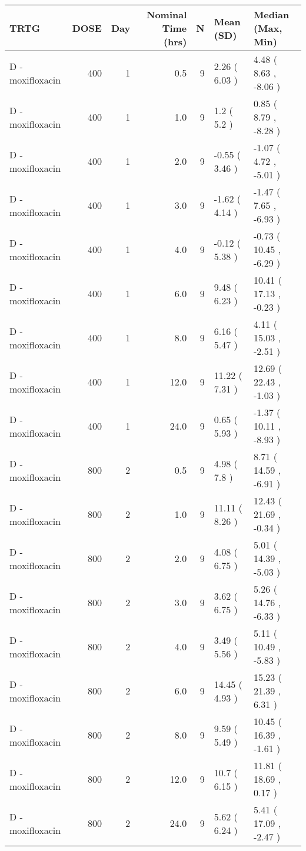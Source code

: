 
\begin{tabular}{lrrrrll}
\toprule
TRTG & DOSE & Day & Nominal Time (hrs) & N & Mean (SD) & Median (Max, Min)\\
\midrule
D - moxifloxacin & 400 & 1 & 0.5 & 9 & 2.26 ( 6.03 ) & 4.48 ( 8.63 , -8.06 )\\
D - moxifloxacin & 400 & 1 & 1.0 & 9 & 1.2 ( 5.2 ) & 0.85 ( 8.79 , -8.28 )\\
D - moxifloxacin & 400 & 1 & 2.0 & 9 & -0.55 ( 3.46 ) & -1.07 ( 4.72 , -5.01 )\\
D - moxifloxacin & 400 & 1 & 3.0 & 9 & -1.62 ( 4.14 ) & -1.47 ( 7.65 , -6.93 )\\
D - moxifloxacin & 400 & 1 & 4.0 & 9 & -0.12 ( 5.38 ) & -0.73 ( 10.45 , -6.29 )\\
D - moxifloxacin & 400 & 1 & 6.0 & 9 & 9.48 ( 6.23 ) & 10.41 ( 17.13 , -0.23 )\\
D - moxifloxacin & 400 & 1 & 8.0 & 9 & 6.16 ( 5.47 ) & 4.11 ( 15.03 , -2.51 )\\
D - moxifloxacin & 400 & 1 & 12.0 & 9 & 11.22 ( 7.31 ) & 12.69 ( 22.43 , -1.03 )\\
D - moxifloxacin & 400 & 1 & 24.0 & 9 & 0.65 ( 5.93 ) & -1.37 ( 10.11 , -8.93 )\\
D - moxifloxacin & 800 & 2 & 0.5 & 9 & 4.98 ( 7.8 ) & 8.71 ( 14.59 , -6.91 )\\
D - moxifloxacin & 800 & 2 & 1.0 & 9 & 11.11 ( 8.26 ) & 12.43 ( 21.69 , -0.34 )\\
D - moxifloxacin & 800 & 2 & 2.0 & 9 & 4.08 ( 6.75 ) & 5.01 ( 14.39 , -5.03 )\\
D - moxifloxacin & 800 & 2 & 3.0 & 9 & 3.62 ( 6.75 ) & 5.26 ( 14.76 , -6.33 )\\
D - moxifloxacin & 800 & 2 & 4.0 & 9 & 3.49 ( 5.56 ) & 5.11 ( 10.49 , -5.83 )\\
D - moxifloxacin & 800 & 2 & 6.0 & 9 & 14.45 ( 4.93 ) & 15.23 ( 21.39 , 6.31 )\\
D - moxifloxacin & 800 & 2 & 8.0 & 9 & 9.59 ( 5.49 ) & 10.45 ( 16.39 , -1.61 )\\
D - moxifloxacin & 800 & 2 & 12.0 & 9 & 10.7 ( 6.15 ) & 11.81 ( 18.69 , 0.17 )\\
D - moxifloxacin & 800 & 2 & 24.0 & 9 & 5.62 ( 6.24 ) & 5.41 ( 17.09 , -2.47 )\\
\bottomrule
\end{tabular}

